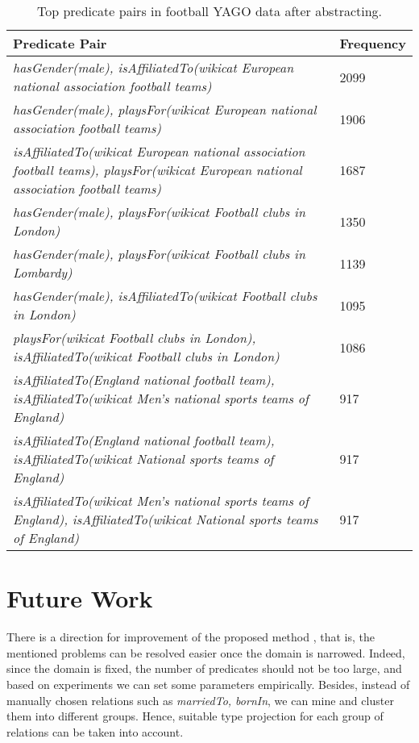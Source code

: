 \documentclass{acm_proc_article-sp}
\begin{document}
\begin{table}[ht]
\caption{Top predicate pairs in football YAGO data after abstracting.}
\label{table6}
\begin{center}
\begin{tabular}{ |p{6cm}|p{1.5cm}| } 
\hline
Predicate Pair & Frequency\\
\hline
\textit{hasGender(male), isAffiliatedTo(wikicat European national association football teams)} & 2099 \\
\hline
\textit{hasGender(male), playsFor(wikicat European national association football teams)} & 1906 \\
\hline
\textit{isAffiliatedTo(wikicat European national association football teams), playsFor(wikicat European national association football teams)} & 1687 \\
\hline
\textit{hasGender(male), playsFor(wikicat Football clubs in London)} & 1350 \\
\hline
\textit{hasGender(male), playsFor(wikicat Football clubs in Lombardy)} & 1139 \\
\hline
\textit{hasGender(male), isAffiliatedTo(wikicat Football clubs in London)} & 1095 \\
\hline
\textit{playsFor(wikicat Football clubs in London), isAffiliatedTo(wikicat Football clubs in London)} & 1086 \\
\hline
\textit{isAffiliatedTo(England national football team), isAffiliatedTo(wikicat Men's national sports teams of England)} & 917 \\
\hline
\textit{isAffiliatedTo(England national football team), isAffiliatedTo(wikicat National sports teams of England)} & 917 \\
\hline
\textit{isAffiliatedTo(wikicat Men's national sports teams of England), isAffiliatedTo(wikicat National sports teams of England)} & 917 \\
\hline
\end{tabular}
\end{center}
\end{table}

\section{Future Work}
\label{section4}

There is a direction for improvement of the proposed method , that is, the mentioned problems can be resolved easier once the domain is narrowed. Indeed, since the domain is fixed, the number of predicates should not be too large, and based on experiments we can set some parameters empirically. Besides, instead of manually chosen relations such as \textit{marriedTo, bornIn}, we can mine and cluster them into different groups. Hence, suitable type projection for each group of relations can be taken into account.



\end{document}
